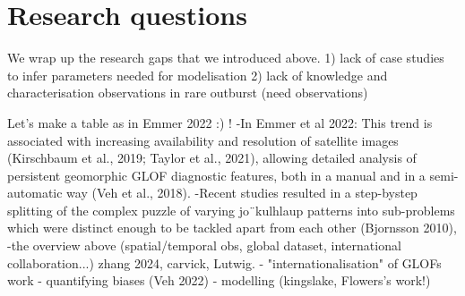 



\section{Research questions}


We wrap up the research gaps that we introduced above. 
1) lack of case studies to infer parameters needed for modelisation 
2) lack of knowledge and characterisation observations in rare outburst (need observations)

Let's make a table as in Emmer 2022 :) ! 
    -In Emmer et al 2022: This trend is associated with increasing availability and resolution of satellite images (Kirschbaum et al., 2019; Taylor et al., 2021), allowing detailed analysis of persistent geomorphic GLOF diagnostic features, both in a manual and in a semi-automatic way (Veh et al., 2018).
      -Recent studies resulted in a step-bystep splitting of the complex puzzle of varying jo¨kulhlaup patterns into sub-problems which were distinct enough to be tackled apart from each other (Bjornsson 2010),
    -the overview above (spatial/temporal obs, global dataset, international collaboration...) zhang 2024, carvick, Lutwig.
    - "internationalisation" of GLOFs work
    - quantifying biases (Veh 2022)
    - modelling (kingslake, Flowers's work!)

